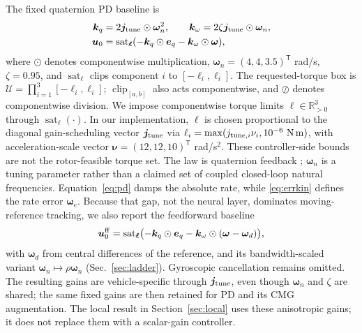 \documentclass[letterpaper, 10 pt, conference]{ieeeconf}
\newcommand{\T}{^{\mathsf T}}
\newcommand{\sat}{\operatorname{sat}}
\newcommand{\clip}{\operatorname{clip}}
\begin{document}
The fixed quaternion PD baseline is
\begin{align}
 \bm k_q&=2\bm j_{\rm tune}\odot\bm\omega_n^2,\qquad
 \bm k_\omega=2\zeta\bm j_{\rm tune}\odot\bm\omega_n,\\
 \bm u_0&=\sat_{\bm\ell}
       (-\bm k_q\odot\bm e_q-\bm k_\omega\odot\bm\omega),
 \label{eq:pd}
\end{align}
where $\odot$ denotes componentwise multiplication,
$\bm\omega_n=(4,4,3.5)\T$ rad/s, $\zeta=0.95$, and
$\sat_{\bm\ell}$ clips component $i$ to $[-\ell_i,\ell_i]$.
%
The requested-torque box is $\mathcal U=\prod_{i=1}^3[-\ell_i,\ell_i]$;
$\clip_{[a,b]}$ also acts componentwise, and $\oslash$ denotes componentwise division.
We impose componentwise torque limits $\bm\ell\in\mathbb R_{>0}^3$ through $\sat_{\bm\ell}(\cdot)$. In our implementation, $\bm\ell$ is chosen proportional to the diagonal gain-scheduling vector $\bm j_{\rm tune}$ via
$\ell_i=\max(j_{{\rm tune},i}\nu_i,10^{-6}\ \mathrm{N\,m})$,
with acceleration-scale vector $\bm\nu=(12,12,10)\T$ rad/s$^2$.
These controller-side bounds are not the rotor-feasible torque set.
%
The law is quaternion feedback \cite{fresk2013quaternion}; $\bm\omega_n$ is a tuning parameter rather than a claimed set of coupled closed-loop natural frequencies.
Equation~\eqref{eq:pd} damps the absolute rate, while \eqref{eq:errkin} defines the rate error $\bm\omega_e$. Because that gap, not the neural layer, dominates moving-reference tracking, we also report the feedforward baseline
\begin{equation}
 \bm u_0^{\rm ff}=\sat_{\bm\ell}\bigl(-\bm k_q\odot\bm e_q-\bm k_\omega\odot(\bm\omega-\bm\omega_d)\bigr),
 \label{eq:pdff}
\end{equation}
with $\bm\omega_d$ from central differences of the reference, and its bandwidth-scaled variant $\bm\omega_n\!\mapsto\!\rho\bm\omega_n$ (Sec.~\ref{sec:ladder}). Gyroscopic cancellation remains omitted.
The resulting gains are vehicle-specific through $\bm j_{\rm tune}$, even though
$\bm\omega_n$ and $\zeta$ are shared; the same fixed gains are then retained
for PD and its CMG augmentation.
The local result in Section~\ref{sec:local} uses these anisotropic gains; it does not replace them with a scalar-gain controller.
%
\end{document}
